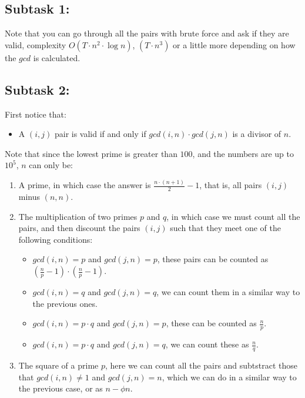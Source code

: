 \hypertarget{subtask-1}{%
\subsection{Subtask 1:}\label{subtask-1}}

Note that you can go through all the pairs with brute force and ask if
they are valid, complexity \(O (T \cdot n^2 \cdot \log {n})\),
\((T \cdot n^3)\) or a little more depending on how the \(gcd\) is
calculated.

\hypertarget{subtask-2}{%
\subsection{Subtask 2:}\label{subtask-2}}

First notice that:

\begin{itemize}
\tightlist
\item
  A \((i, j)\) pair is valid if and only if
  \(gcd (i, n) \cdot gcd (j, n)\) is a divisor of \(n\).
\end{itemize}

Note that since the lowest prime is greater than \(100\), and the
numbers are up to \(10 ^ 5\), \(n\) can only be:

\begin{enumerate}
\def\labelenumi{\arabic{enumi}.}
\item
  A prime, in which case the answer is
  \(\frac{n \cdot {(n + 1)}}{2} -1\), that is, all pairs \((i, j)\)
  minus \((n , n)\).
\item
  The multiplication of two primes \(p\) and \(q\), in which case we
  must count all the pairs, and then discount the pairs \((i, j)\) such
  that they meet one of the following conditions:

  \begin{itemize}
  \item
    \(gcd (i, n) = p\) and \(gcd (j, n) = p\), these pairs can be
    counted as \((\frac {n} {p} -1) \cdot (\frac {n} {p} -1)\).
  \item
    \(gcd (i, n) = q\) and \(gcd (j, n) = q\), we can count them in a
    similar way to the previous ones.
  \item
    \(gcd (i, n) = p \cdot q\) and \(gcd (j, n) = p\), these can be
    counted as \(\frac {n} {p}\).
  \item
    \(gcd (i, n) = p \cdot q\) and \(gcd (j, n) = q\), we can count
    these as \(\frac {n} {q}\).
  \end{itemize}
\item
  The square of a prime \(p\), here we can count all the pairs and
  subtstract those that \(gcd (i, n) \neq 1\) and \(gcd (j, n) = n\),
  which we can do in a similar way to the previous case, or as
  \(n - \phi {n}\).
\end{enumerate}

